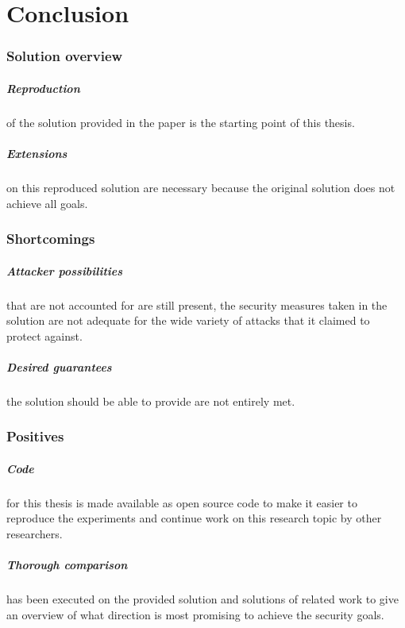 \chapter{Conclusion}

\subsection*{Solution overview}

\paragraph*{Reproduction}
of the solution provided in the paper is the starting point of this thesis.

\paragraph*{Extensions}
on this reproduced solution are necessary because the original solution does not achieve all goals.

\subsection*{Shortcomings}

\paragraph*{Attacker possibilities}
that are not accounted for are still present, the security measures taken in the solution are not adequate for the wide variety of attacks that it claimed to protect against.

\paragraph*{Desired guarantees}
the solution should be able to provide are not entirely met.

\subsection*{Positives}

\paragraph*{Code}
for this thesis is made available as open source code to make it easier to reproduce the experiments and continue work on this research topic by other researchers.

\paragraph*{Thorough comparison}
has been executed on the provided solution and solutions of related work to give an overview of what direction is most promising to achieve the security goals.